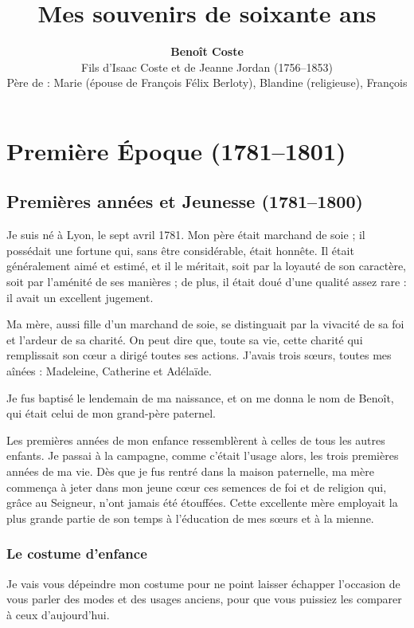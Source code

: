 \documentclass[11pt,a4paper]{report}
\title{\Huge \textbf{Mes souvenirs de soixante ans}}
\author{\textbf{Benoît Coste} \\ 
\small Fils d'Isaac Coste et de Jeanne Jordan (1756--1853) \\
\small Père de : Marie (épouse de François Félix Berloty), Blandine (religieuse), François}
\date{}
\begin{document}
\maketitle

\newpage
\tableofcontents
\newpage

\part*{Première Époque (1781--1801)}

\chapter{Premières années et Jeunesse (1781--1800)}

Je suis né à Lyon, le sept avril 1781. Mon père était marchand de soie ; il possédait une fortune qui, sans être considérable, était honnête. Il était généralement aimé et estimé, et il le méritait, soit par la loyauté de son caractère, soit par l'aménité de ses manières ; de plus, il était doué d'une qualité assez rare : il avait un excellent jugement.

Ma mère, aussi fille d'un marchand de soie, se distinguait par la vivacité de sa foi et l'ardeur de sa charité. On peut dire que, toute sa vie, cette charité qui remplissait son cœur a dirigé toutes ses actions. J'avais trois sœurs, toutes mes aînées : Madeleine, Catherine et Adélaïde.

Je fus baptisé le lendemain de ma naissance, et on me donna le nom de Benoît, qui était celui de mon grand-père paternel.

Les premières années de mon enfance ressemblèrent à celles de tous les autres enfants. Je passai à la campagne, comme c'était l'usage alors, les trois premières années de ma vie. Dès que je fus rentré dans la maison paternelle, ma mère commença à jeter dans mon jeune cœur ces semences de foi et de religion qui, grâce au Seigneur, n'ont jamais été étouffées. Cette excellente mère employait la plus grande partie de son temps à l'éducation de mes sœurs et à la mienne.

\section*{Le costume d'enfance}

Je vais vous dépeindre mon costume pour ne point laisser échapper l'occasion de vous parler des modes et des usages anciens, pour que vous puissiez les comparer à ceux d'aujourd'hui.
\end{document}
